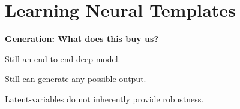 \documentclass[aspectratio=169,12pt]{beamer}
\let\tempone\itemize
\let\temptwo\enditemize
\renewenvironment{itemize}{\tempone\addtolength{\itemsep}{0.5\baselineskip}}{\temptwo}
\newcommand{\thetitle}[1]{{\begin{center}\textbf{{#1}}\end{center}}}
\newcommand{\air}{\vspace{0.25cm}}
\begin{document}
\section{Learning Neural Templates}




{



% 
% 
}


\begin{frame}
\centerline{\textbf{Generation: What does this buy us?}}
\air

\begin{itemize}
\item Still an end-to-end deep model.
\air
\item Still can generate any possible output.
\air

\item Latent-variables do not inherently provide robustness.
\end{itemize}

\end{frame}

{



 
% 
}




\end{document}

